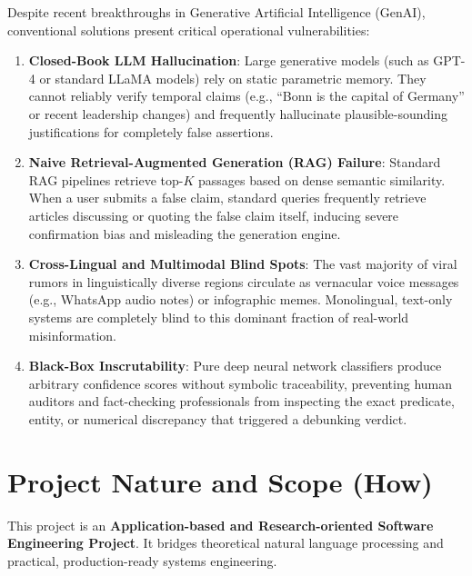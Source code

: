 \documentclass[12pt,a4paper]{report}
\begin{document}
Despite recent breakthroughs in Generative Artificial Intelligence (GenAI), conventional solutions present critical operational vulnerabilities:
\begin{enumerate}
    \item \textbf{Closed-Book LLM Hallucination}: Large generative models (such as GPT-4 or standard LLaMA models) rely on static parametric memory. They cannot reliably verify temporal claims (e.g., ``Bonn is the capital of Germany'' or recent leadership changes) and frequently hallucinate plausible-sounding justifications for completely false assertions.
    \item \textbf{Naive Retrieval-Augmented Generation (RAG) Failure}: Standard RAG pipelines retrieve top-$K$ passages based on dense semantic similarity. When a user submits a false claim, standard queries frequently retrieve articles discussing or quoting the false claim itself, inducing severe confirmation bias and misleading the generation engine.
    \item \textbf{Cross-Lingual and Multimodal Blind Spots}: The vast majority of viral rumors in linguistically diverse regions circulate as vernacular voice messages (e.g., WhatsApp audio notes) or infographic memes. Monolingual, text-only systems are completely blind to this dominant fraction of real-world misinformation.
    \item \textbf{Black-Box Inscrutability}: Pure deep neural network classifiers produce arbitrary confidence scores without symbolic traceability, preventing human auditors and fact-checking professionals from inspecting the exact predicate, entity, or numerical discrepancy that triggered a debunking verdict.
\end{enumerate}

\section{Project Nature and Scope (How)}
This project is an \textbf{Application-based and Research-oriented Software Engineering Project}. It bridges theoretical natural language processing and practical, production-ready systems engineering. 
\end{document}
